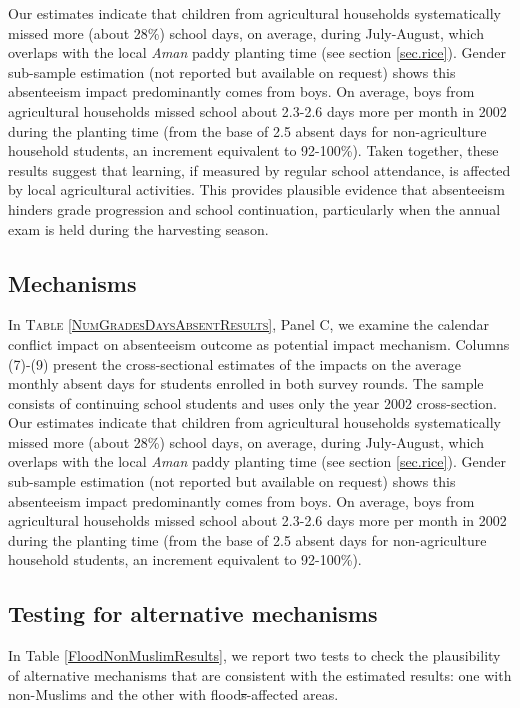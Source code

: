 \documentclass[12pt,letterpaper]{article}
\newcommand{\0}{\ensuremath{\mbox{\boldmath $0$}}}
\begin{document}
Our estimates indicate that children from agricultural households systematically missed more (about 28\%) school days, on average, during July-August, which overlaps with the local \textit{Aman} paddy planting time (see section \ref{sec.rice}). Gender sub-sample estimation (not reported but available on request) shows this absenteeism impact predominantly comes from boys. On average, boys from agricultural households missed school about 2.3-2.6 days more per month in 2002 during the planting time (from the base of 2.5 absent days for non-agriculture household students, an increment equivalent to 92-100\%). Taken together, these results suggest that learning, if measured by regular school attendance, is affected by local agricultural activities. This provides plausible evidence that absenteeism hinders grade progression and school continuation, particularly when the annual exam is held during the harvesting season.

\subsection{Mechanisms}

In \textsc{\small Table \ref{NumGradesDaysAbsentResults}}, Panel C, we examine the calendar conflict impact on absenteeism outcome as potential impact mechanism. Columns (7)-(9) present the cross-sectional estimates of the impacts on the average monthly absent days for students enrolled in both survey rounds. The sample consists of continuing school students and uses only the year 2002 cross-section. Our estimates indicate that children from agricultural households systematically missed more (about 28\%) school days, on average, during July-August, which overlaps with the local \textit{Aman} paddy planting time (see section \ref{sec.rice}). Gender sub-sample estimation (not reported but available on request) shows this absenteeism impact predominantly comes from boys. On average, boys from agricultural households missed school about 2.3-2.6 days more per month in 2002 during the planting time (from the base of 2.5 absent days for non-agriculture household students, an increment equivalent to 92-100\%). 

\subsection{Testing for alternative mechanisms}

In Table \ref{FloodNonMuslimResults}, we report two tests to check the plausibility of alternative mechanisms that are consistent with the estimated results: one with non-Muslims and the other with flood\sout{s}-affected areas. 
\end{document}
